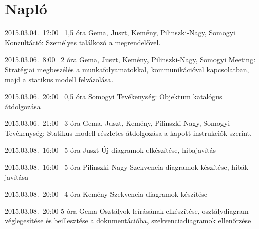 %
\section{Napló}

\begin{naplo}
	
\bejegyzes
{2015.03.04.~12:00~} %
{1,5 óra} %
{Gema, Juszt, Kemény, Pilinszki-Nagy, Somogyi} %
{Konzultáció: Személyes találkozó a megrendelővel.} %

\bejegyzes
{2015.03.06.~8:00~} %
{2 óra} %
{Gema, Juszt, Kemény, Pilinszki-Nagy, Somogyi} %
{Meeting: Stratégiai megbeszélés a munkafolyamatokkal, kommunikációval kapcsolatban, majd a statikus modell felvázolása.} %

\bejegyzes
{2015.03.06.~20:00~} %
{0,5 óra} %
{Somogyi} %
{Tevékenység: Objektum katalógus átdolgozása} %

\bejegyzes
{2015.03.06.~21:00~}
{3 óra}
{Gema, Juszt, Kemény, Pilinszki-Nagy, Somogyi}
{Tevékenység: Statikus modell részletes átdolgozása a kapott instrukciók szerint.}

\bejegyzes
{2015.03.08.~16:00~} %
{5 óra} %
{Juszt} %
{Új diagramok elkészítése, hibajavítás} %

\bejegyzes
{2015.03.08.~16:00~} %
{5 óra} %
{Pilinszki-Nagy} %
{Szekvencia diagramok készítése, hibák javítása} %

\bejegyzes
{2015.03.08.~20:00~} %
{4 óra} %
{Kemény} %
{Szekvencia diagramok készítése} %

\bejegyzes
{2015.03.08.~20:00} %
{5 óra} %
{Gema} %
{Osztályok leírásának elkészítése, osztálydiagram véglegesítése és beillesztése a dokumentációba, szekvenciadiagramok ellenőrzése} %

\end{naplo}

